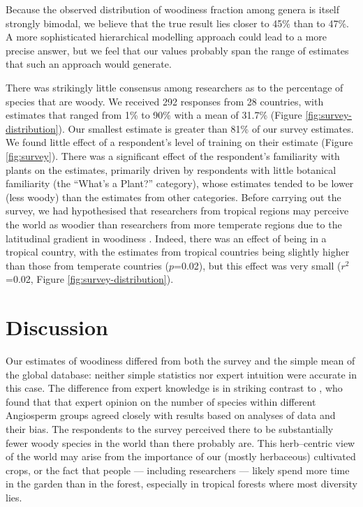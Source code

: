 \documentclass[a4paper,12pt]{article}
\begin{document}
%
Because the observed distribution of woodiness fraction among genera
is itself strongly bimodal, we believe that the true result lies
closer to 45\% than to 47\%.  A more sophisticated hierarchical
modelling approach could lead to a more precise answer, but we feel
that our values probably span the range of estimates that such an
approach would generate.

There was strikingly little consensus among researchers as to the
percentage of species that are woody.  We received 292 responses from
28 countries, with estimates that ranged from 1\% to 90\% with a mean
of 31.7\% (Figure \ref{fig:survey-distribution}).  Our smallest
estimate is greater than 81\% of our survey estimates.
We found little effect of a respondent's level of training on their
estimate (Figure \ref{fig:survey}).  There was a significant effect of
the respondent's familiarity with plants on the estimates, primarily
driven by respondents with little botanical familiarity (the ``What's
a Plant?'' category), whose estimates tended to be lower (less woody)
than the estimates from other categories.
%
Before carrying out the survey, we had hypothesised that researchers
from tropical regions may perceive the world as woodier than
researchers from more temperate regions due to the latitudinal
gradient in woodiness \citep{Molesheihgt}.
%
Indeed, there was an effect of being in a tropical country, with the
estimates from tropical countries being slightly higher than those
from temperate countries ($p$=0.02), but this effect was very small
($r^2$=0.02, Figure \ref{fig:survey-distribution}).




\section{Discussion}

Our estimates of woodiness differed from both the survey and the
simple mean of the global database: neither simple statistics nor
expert intuition were accurate in this case.  The difference from
expert knowledge is in striking contrast to \citet{joppa2010}, who
found that that expert opinion on the number of species within
different Angiosperm groups agreed closely with results based on
analyses of data and their bias.
The respondents to the survey perceived there to be substantially fewer woody
species in the world than there probably are.  This herb--centric view
of the world may arise from the importance of our (mostly herbaceous)
cultivated crops, or the fact that people --- including researchers
--- likely spend more time in the garden than in the forest, especially in tropical forests where most diversity lies.
\end{document}
